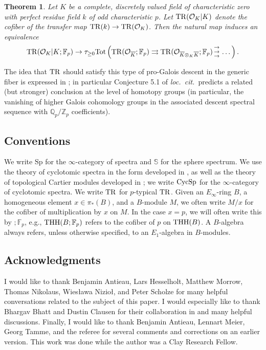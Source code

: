 \documentclass{amsart}
\newcommand{\triplearrows}{\begin{smallmatrix} \to \\ \to \\ 
\to \end{smallmatrix} }
\renewcommand{\sp}{\mathrm{Sp}}
\newtheorem{theorem}{Theorem}[section]
\theoremstyle{definition}
\begin{document}
\begin{theorem} 
Let $K$ be a complete, discretely valued field of characteristic zero with
perfect residue field $k$ of odd
characteristic $p$. 
Let $\mathrm{TR}(\mathcal{O}_K|K)$ denote the cofiber of the transfer map 
$\mathrm{TR}(k) \to \mathrm{TR}(\mathcal{O}_K)$. 
Then the natural map induces an equivalence
\[ \TR(\mathcal{O}_K|K; \mathbb{F}_p) \to \tau_{\geq 0}\mathrm{Tot} \left(  \TR(
\mathcal{O}_{\overline{K}}; \mathbb{F}_p)
\rightrightarrows 
\TR( \mathcal{O}_{\overline{K} \otimes_K \overline{K}}; \mathbb{F}_p)
\triplearrows \dots  \right). 
\]
\end{theorem} 


The idea that $\mathrm{TR}$ should satisfy this type of pro-Galois descent in the
generic fiber
is expressed in \cite{HesICM}; in particular Conjecture 5.1 of \emph{loc.~cit.}~predicts a related (but stronger) conclusion at the level of homotopy groups (in particular, the
vanishing of higher Galois cohomology groups in the associated descent spectral
sequence with $\mathbb{Q}_p/\mathbb{Z}_p$ coefficients). 

\subsection*{Conventions}

We write $\sp$ for the $\infty$-category of spectra and $\mathbb{S}$ for the
sphere spectrum. 
We use the theory of cyclotomic spectra in the form developed in
\cite{NS18}, as well as the theory of topological Cartier modules developed in
\cite{AN}; we write $\mathrm{CycSp}$ for the $\infty$-category of cyclotomic spectra. 
We write $\mathrm{TR}$ for $p$-typical $\mathrm{TR}$. 
Given an $E_\infty$-ring $B$, a homogeneous element $x \in \pi_*(B)$, and a
$B$-module $M$, we
often write $M/x$ for the cofiber of multiplication by $x$ on $M$. 
In the case $x =p$, we will often write this by $; \mathbb{F}_p$, e.g., $\mathrm{THH}(B;
\mathbb{F}_p)$ refers to the cofiber of $p$ on $\mathrm{THH}(B)$. 
A $B$-algebra always refers, unless otherwise specified, to an $E_1$-algebra in
$B$-modules. 


\subsection*{Acknowledgments}

I would like to thank 
Benjamin Antieau, Lars Hesselholt, Matthew Morrow, Thomas Nikolaus, 
Wies{\l}awa Nizio\l, and Peter Scholze for many
helpful conversations related to the subject of this paper. 
I would especially like to thank Bhargav Bhatt and Dustin Clausen for their
collaboration in \cite{BCM} and many helpful discussions. 
Finally, I would like to thank Benjamin Antieau, Lennart Meier, Georg Tamme,
and the referee for several comments and corrections on an earlier version. 
{This work was done while the author was a Clay Research Fellow.}
\end{document}
